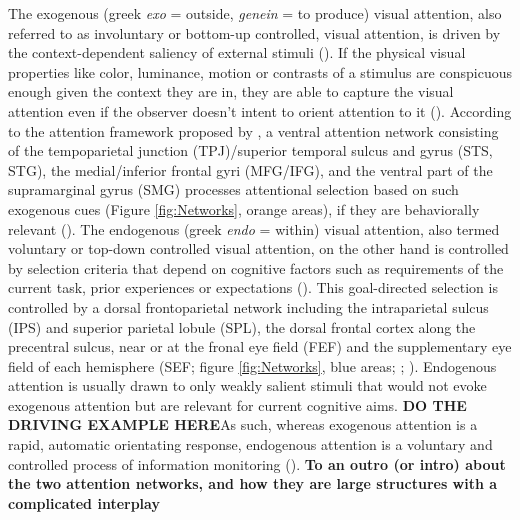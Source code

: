 \documentclass[a4paper, 12pt]{scrreprt}
\begin{document}
The exogenous (greek \textit{exo} = outside, \textit{genein} = to produce) visual attention, also referred to as involuntary or bottom-up controlled, visual attention, is driven by the context-dependent saliency of external stimuli (\cite{itti2001computational}). If the physical visual properties like color, luminance, motion or contrasts of a stimulus are conspicuous enough given the context they are in, they are able to capture the visual attention even if the observer doesn’t intent to orient attention to it (\cite{chica2013two}). According to the attention framework proposed by \textcite{corbetta2002control}, a ventral attention network consisting of the tempoparietal junction (TPJ)/superior temporal sulcus and gyrus (STS, STG), the medial/inferior frontal gyri (MFG/IFG), and the ventral part of the supramarginal gyrus (SMG) processes attentional selection based on such exogenous cues (Figure \ref{fig:Networks}, orange areas), if they are behaviorally relevant (\cite{downar2000multimodal}).
The endogenous (greek \textit{endo} = within) visual attention, also termed voluntary or top-down controlled visual attention, on the other hand is controlled by selection criteria that depend on cognitive factors such as requirements of the current task, prior experiences or expectations (\cite{itti2001computational}). This goal-directed selection is controlled by a dorsal frontoparietal network including the intraparietal sulcus (IPS) and superior parietal lobule (SPL), the dorsal frontal cortex along the precentral sulcus, near or at the fronal eye field (FEF) and the supplementary eye field of each hemisphere (SEF; figure \ref{fig:Networks}, blue areas; \cite{corbetta2002control}; \cite{corbetta2008reorienting}). Endogenous attention is usually drawn to only weakly salient stimuli that would not evoke exogenous attention but are relevant for current cognitive aims. \textbf{DO THE DRIVING EXAMPLE HERE}As such, whereas exogenous attention is a rapid, automatic orientating response, endogenous attention is a voluntary and controlled process of information monitoring (\cite{carrasco2011visual}).
\textbf{To an outro (or intro) about the two attention networks, and how they are large structures with a complicated interplay}
\end{document}
